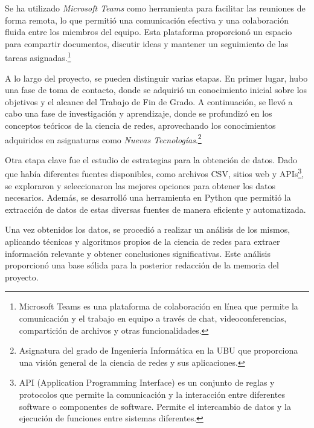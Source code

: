 Se ha utilizado \textit{Microsoft Teams} como herramienta para facilitar las reuniones de forma remota, 
lo que permitió una comunicación efectiva y una colaboración fluida entre los miembros del equipo. 
Esta plataforma proporcionó un espacio para compartir documentos, discutir ideas y mantener un 
seguimiento de las tareas asignadas.\footnote{Microsoft Teams es una plataforma de colaboración 
en línea que permite la comunicación y el trabajo en equipo a través de chat, videoconferencias, 
compartición de archivos y otras funcionalidades.}

A lo largo del proyecto, se pueden distinguir varias etapas. En primer lugar, hubo una fase de 
toma de contacto, donde se adquirió un conocimiento inicial sobre los objetivos y el alcance del 
Trabajo de Fin de Grado. A continuación, se llevó a cabo una fase de investigación y aprendizaje, 
donde se profundizó en los conceptos teóricos de la ciencia de redes, aprovechando los conocimientos 
adquiridos en asignaturas como \textit{Nuevas Tecnologías}.\footnote{Asignatura del grado de Ingeniería 
Informática en la UBU que proporciona una visión general de la ciencia de redes y sus aplicaciones.}

Otra etapa clave fue el estudio de estrategias para la obtención de datos. Dado que había 
diferentes fuentes disponibles, como archivos CSV, sitios web y APIs\footnote{API (Application Programming Interface) es un 
conjunto de reglas y protocolos que permite la comunicación y la interacción entre diferentes 
software o componentes de software. Permite el intercambio de datos y la ejecución de funciones 
entre sistemas diferentes.}, se exploraron y 
seleccionaron las mejores opciones para obtener los datos necesarios. Además, se desarrolló 
una herramienta en Python que permitió la extracción de datos de estas diversas fuentes de 
manera eficiente y automatizada.

Una vez obtenidos los datos, se procedió a realizar un análisis de los mismos, aplicando técnicas 
y algoritmos propios de la ciencia de redes para extraer información relevante y obtener conclusiones 
significativas. Este análisis proporcionó una base sólida para la posterior redacción de la memoria 
del proyecto.